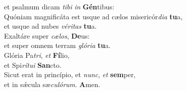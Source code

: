\evenverse et psalmum dicam \textit{ti}\textit{bi} \textit{in} \textbf{Gén}tibus:\\
\oddverse Quóniam magnificáta est usque ad cælos misericór\textit{di}\textit{a} \textbf{tu}a,~\*\\
\oddverse et usque ad nubes \textit{vé}\textit{ri}\textit{tas} \textbf{tu}a.\\
\evenverse Exaltáre super \textit{cæ}\textit{los}, \textbf{De}us:~\*\\
\evenverse et super omnem terram \textit{gló}\textit{ri}\textit{a} \textbf{tu}a.\\
\oddverse Glória Pa\textit{tri}, \textit{et} \textbf{Fí}lio,~\*\\
\oddverse et Spi\textit{rí}\textit{tu}\textit{i} \textbf{San}cto.\\
\evenverse Sicut erat in princípio, et \textit{nunc}, \textit{et} \textbf{sem}per,~\*\\
\evenverse et in sǽcula sæ\textit{cu}\textit{ló}\textit{rum}. \textbf{A}men.\\
